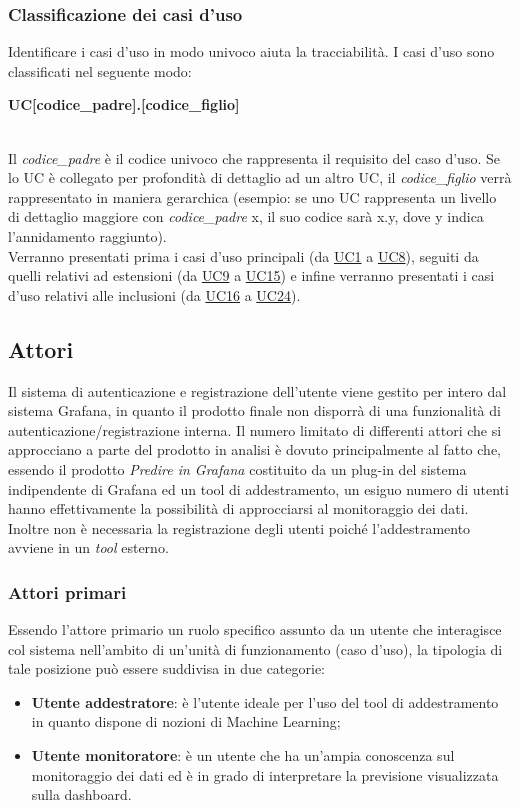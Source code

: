 \subsubsection{Classificazione dei casi d'uso}
Identificare i casi d’uso in modo univoco aiuta la tracciabilità. I casi d’uso sono classificati nel seguente modo: \\
\centerline{\textbf{UC[codice\_padre].[codice\_figlio]}} \\
Il \textit{codice\_padre} è il codice univoco che rappresenta il requisito del caso d’uso. Se lo UC è collegato per profondità di dettaglio ad un altro UC, il \textit{codice\_figlio} verrà rappresentato in maniera gerarchica (esempio: se uno UC rappresenta un livello di dettaglio maggiore con \textit{codice\_padre} x, il suo codice sarà x.y, dove y indica l’annidamento raggiunto). \\ Verranno presentati prima i casi d'uso principali (da \hyperref[par:UC1]{UC1} a \hyperref[par:UC8]{UC8}), seguiti da quelli relativi ad estensioni (da \hyperref[par:UC9]{UC9} a \hyperref[par:UC15]{UC15}) e infine verranno presentati i casi d'uso relativi alle inclusioni (da \hyperref[par:UC16]{UC16} a \hyperref[par:UC24]{UC24}).

	\subsection{Attori}
Il sistema di autenticazione e registrazione dell’utente viene gestito per intero dal sistema Grafana, in quanto il prodotto finale non disporrà di una funzionalità di autenticazione/registrazione interna.
Il numero limitato di differenti attori che si approcciano a parte del prodotto in analisi è dovuto principalmente al fatto che, essendo il prodotto \emph{Predire in Grafana} costituito da un plug-in del sistema indipendente di Grafana ed un tool di addestramento, un esiguo numero di utenti hanno effettivamente la possibilità di approcciarsi al monitoraggio dei dati. Inoltre non è necessaria la  registrazione degli utenti poiché l'addestramento avviene in un \emph{tool} esterno.

	\subsubsection{Attori primari}
Essendo l’attore primario un ruolo specifico assunto da un utente che interagisce col sistema nell’ambito di un’unità di funzionamento (caso d’uso), la tipologia di tale posizione può essere suddivisa in due categorie:
	\begin{itemize}
		\item\textbf{Utente addestratore}: è l’utente ideale per l’uso del tool di addestramento in quanto dispone di nozioni di Machine Learning;
		\item\textbf{Utente monitoratore}: è un utente che ha un’ampia conoscenza sul monitoraggio dei dati ed è in grado di interpretare la previsione visualizzata sulla dashboard.
		
	\end{itemize}

